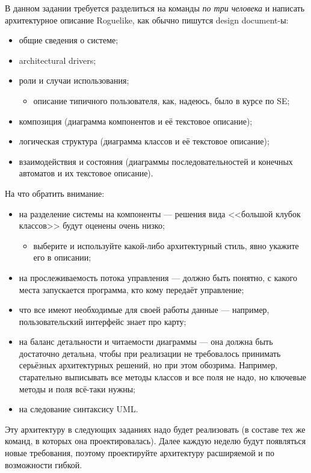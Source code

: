 \documentclass[a5paper]{homework}
\begin{document}
В данном задании требуется разделиться на команды \emph{по три человека} и написать архитектурное описание Roguelike, как обычно пишутся design document-ы:

\begin{itemize}
    \item общие сведения о системе;
    \item architectural drivers;
    \item роли и случаи использования;
    \begin{itemize}
        \item описание типичного пользователя, как, надеюсь, было в курсе по SE;
    \end{itemize}
    \item композиция (диаграмма компонентов и её текстовое описание);
    \item логическая структура (диаграмма классов и её текстовое описание);
    \item взаимодействия и состояния (диаграммы последовательностей и конечных автоматов и их текстовое описание).
\end{itemize}

На что обратить внимание:

\begin{itemize}
    \item на разделение системы на компоненты --- решения вида <<большой клубок классов>> будут оценены очень низко;
    \begin{itemize}
        \item выберите и используйте какой-либо архитектурный стиль, явно укажите его в описании;
    \end{itemize}
    \item на прослеживаемость потока управления --- должно быть понятно, с какого места запускается программа, кто кому передаёт управление;
    \item что все имеют необходимые для своей работы данные --- например, пользовательский интерфейс знает про карту;
    \item на баланс детальности и читаемости диаграммы --- она должна быть достаточно детальна, чтобы при реализации не требовалось принимать серьёзных архитектурных решений, но при этом обозрима. Например, старательно выписывать все методы классов и все поля не надо, но ключевые методы и поля всё-таки нужны;
    \item на следование синтаксису UML.
\end{itemize}

Эту архитектуру в следующих заданиях надо будет реализовать (в составе тех же команд, в которых она проектировалась). Далее каждую неделю будут появляться новые требования, поэтому проектируйте архитектуру расширяемой и по возможности гибкой.
\end{document}
